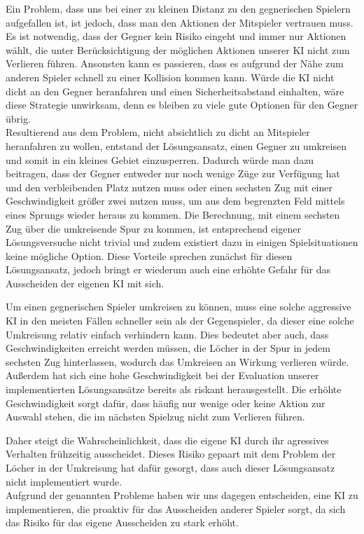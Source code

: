 Ein Problem, dass uns bei einer zu kleinen Distanz zu den gegnerischen Spielern aufgefallen ist, ist jedoch, dass man
den Aktionen der Mitspieler vertrauen muss.
Es ist notwendig, dass der Gegner kein Risiko eingeht und immer nur Aktionen wählt, die unter Berücksichtigung der
möglichen Aktionen unserer \ac{KI} nicht zum Verlieren führen.
Ansonsten kann es passieren, dass es aufgrund der Nähe zum anderen Spieler schnell zu einer Kollision kommen kann.
Würde die \ac{KI} nicht dicht an den Gegner heranfahren und einen Sicherheitsabstand einhalten, wäre diese Strategie
unwirksam, denn es bleiben zu viele gute Optionen für den Gegner übrig. \\

Resultierend aus dem Problem, nicht absichtlich zu dicht an Mitspieler heranfahren zu wollen, entstand der
Lösungsansatz, einen Gegner zu umkreisen und somit in ein kleines Gebiet einzusperren.
Dadurch würde man dazu beitragen, dass der Gegner entweder nur noch wenige Züge zur Verfügung hat und den verbleibenden
Platz nutzen muss oder einen sechsten Zug mit einer Geschwindigkeit größer zwei nutzen muss, um aus dem begrenzten Feld
mittels eines Sprungs wieder heraus zu kommen.
Die Berechnung, mit einem sechsten Zug über die umkreisende Spur zu kommen, ist entsprechend eigener Lösungsversuche
nicht trivial und zudem existiert dazu in einigen Spielsituationen keine mögliche Option.
Diese Vorteile sprechen zunächst für diesen Lösungsansatz, jedoch bringt er wiederum auch eine erhöhte Gefahr für das
Ausscheiden der eigenen \ac{KI} mit sich.

Um einen gegnerischen Spieler umkreisen zu können, muss eine solche aggressive \ac{KI} in den meisten Fällen schneller
sein als der Gegenspieler, da dieser eine solche Umkreisung relativ einfach verhindern kann.
Dies bedeutet aber auch, dass Geschwindigkeiten erreicht werden müssen, die Löcher in der Spur in jedem sechsten Zug
hinterlassen, wodurch das Umkreisen an Wirkung verlieren würde.
Außerdem hat sich eine hohe Geschwindigkeit bei der Evaluation unserer implementierten Lösungsansätze bereits als
riskant herausgestellt. 
Die erhöhte Geschwindigkeit sorgt dafür, dass häufig nur wenige oder keine Aktion zur Auswahl stehen, die im
nächsten Spielzug nicht zum Verlieren führen.

Daher steigt die Wahrscheinlichkeit, dass die eigene \ac{KI} durch ihr agressives Verhalten frühzeitig ausscheidet.
Dieses Risiko gepaart mit dem Problem der Löcher in der Umkreisung hat dafür gesorgt, dass auch dieser Lösungsansatz
nicht implementiert wurde. \\

Aufgrund der genannten Probleme haben wir uns dagegen entscheiden, eine \ac{KI} zu implementieren, die proaktiv für das
Ausscheiden anderer Spieler sorgt, da sich das Risiko für das eigene Ausscheiden zu stark erhöht.